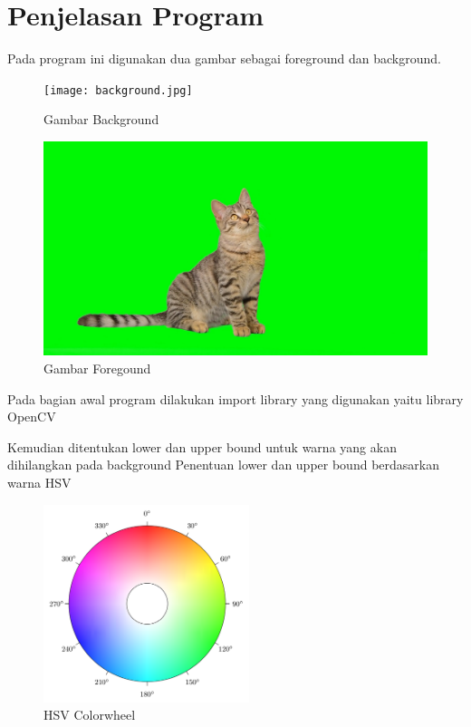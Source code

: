 \documentclass[]{article}
\begin{document}
\section{Penjelasan Program}
\par
Pada program ini digunakan dua gambar sebagai foreground dan background.
\begin{figure}[H]
    \centering
    \texttt{[image: background.jpg]}
    \caption{Gambar Background}
\end{figure}
\begin{figure}[H]
    \centering
    \includegraphics[width=12cm]{foreground.png}
    \caption{Gambar Foregound}
\end{figure}

Pada bagian awal program dilakukan import library yang digunakan yaitu library OpenCV

Kemudian ditentukan lower dan upper bound untuk warna yang akan dihilangkan pada background
Penentuan lower dan upper bound berdasarkan warna HSV
\begin{figure}[H]
    \centering
    \includegraphics[width=6cm]{hsvcolorwheel.png}
    \caption{HSV Colorwheel}
\end{figure}
\end{document}
